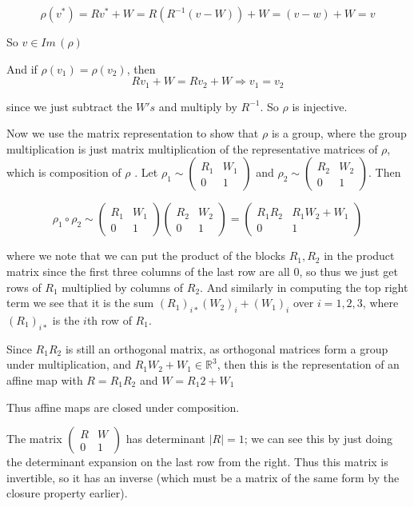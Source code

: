 \documentclass{article}
\begin{document}
\[ \rho(v^*) = R v^* + W = R (R^{-1} (v - W)) + W = (v - w) + W = v \]

So $v \in Im \, (\rho) $

And if $\rho(v_1) = \rho(v_2)$, then
\[ Rv_1 + W = Rv_2 + W \Longrightarrow v_1 = v_2 \]

since we just subtract the $W's$ and multiply by $R^{-1}$. So $\rho$ is injective. 

Now we use the matrix representation to show that $\rho$ is a group, where the group multiplication is just matrix multiplication of the representative matrices of $\rho$, which is composition of $\rho$ . Let $\rho_1 \sim \left(\begin{array}{cc} R_1 & W_1 \\ 0 & 1 \end{array}\right)$ and $\rho_2 \sim \left( \begin{array}{cc} R_2 & W_2 \\ 0 & 1 \end{array}\right)$. Then 

\[\rho_1 \circ \rho_2 \sim \left(\begin{array}{cc} R_1 & W_1 \\ 0 & 1 \end{array}\right) \left( \begin{array}{cc} R_2 & W_2 \\ 0 & 1 \end{array}\right) = \left(\begin{array}{cc} R_1 R_2 & R_1 W_2 + W_1 \\ 0 & 1 \end{array}\right)\]

where we note that we can put the product of the blocks $R_1, R_2$ in the product matrix since the first three columns of the last row are all 0, so thus we just get rows of $R_1$ multiplied by columns of $R_2$. And similarly in computing the top right term we see that it is the sum $(R_1)_{i*} (W_2)_i + (W_1)_i$ over $i=1,2,3$, where $(R_1)_{i*}$ is the $i$th row of $R_1$. 

Since $R_1 R_2$ is still an orthogonal matrix, as orthogonal matrices form a group under multiplication, and $R_1 W_2 + W_1 \in \mathbb{R}^3$, then this is the representation of an affine map with $R = R_1 R_2$ and $W = R_1 2 + W_1$

Thus affine maps are closed under composition. 

The matrix $\left(\begin{array}{cc} R & W \\ 0 & 1 \end{array}\right)$ has determinant $|R| = 1$; we can see this by just doing the determinant expansion on the last row from the right. Thus this matrix is invertible, so it has an inverse (which must be a matrix of the same form by the closure property earlier). 
\end{document}
